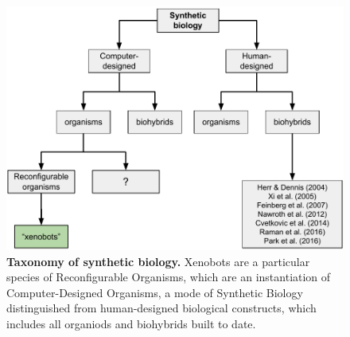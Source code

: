 

\begin{figure}[t]
    \centering
    \includegraphics[width=0.8\linewidth]{fig/synthbio.pdf}
    \vspace{1pt}
    \caption{%
    \textbf{Taxonomy of synthetic biology.}
    Xenobots are a particular species of Reconfigurable Organisms, which are an instantiation of Computer-Designed Organisms, a mode of Synthetic Biology distinguished from human-designed biological constructs, which includes all organiods and biohybrids built to date.
    \label{fig:synthbio}%
    }
\end{figure}


